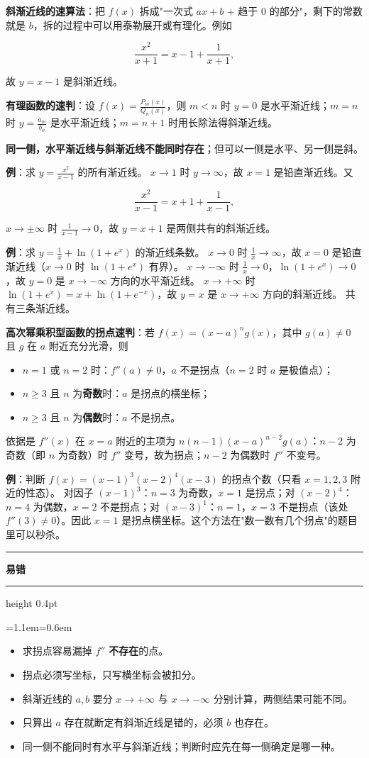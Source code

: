 \documentclass[11pt,openany,UTF8]{ctexbook}
\newcommand{\callouthead}[2]{%
  \par\addvspace{7pt}\noindent
  {\color{#1}\rule[-0.15em]{3pt}{1.05em}}\hspace{0.5em}%
  {\bfseries\color{#1}#2}\par\nobreak\vspace{-0.35em}%
  {\color{rulesep}\hrule height 0.4pt}\nobreak\vspace{0.45em}%
  \begingroup\small\setlength{\parindent}{0pt}%
  \leftskip=1.1em\rightskip=0.6em\noindent\ignorespaces}
\newcommand{\calloutend}{\par\endgroup\addvspace{7pt}}
\newenvironment{callwarn}[1]{\callouthead{warnbar}{#1}}{\calloutend}
\begin{document}
\textbf{斜渐近线的速算法}：把 $f(x)$ 拆成"一次式 $ax+b$ + 趋于 0 的部分"，剩下的常数就是 $b$，拆的过程中可以用泰勒展开或有理化。例如

\[\frac{x^2}{x+1}=x-1+\frac{1}{x+1},\]

故 $y=x-1$ 是斜渐近线。

\textbf{有理函数的速判}：设 $f(x)=\frac{P_m(x)}{Q_n(x)}$，则 $m<n$ 时 $y=0$ 是水平渐近线；$m=n$ 时 $y=\frac{a_m}{b_n}$ 是水平渐近线；$m=n+1$ 时用长除法得斜渐近线。

\textbf{同一侧，水平渐近线与斜渐近线不能同时存在}；但可以一侧是水平、另一侧是斜。

\textbf{例}：求 $y=\frac{x^2}{x-1}$ 的所有渐近线。 $x\to1$ 时 $y\to\infty$，故 $x=1$ 是铅直渐近线。又

\[\frac{x^2}{x-1}=x+1+\frac{1}{x-1},\]

$x\to\pm\infty$ 时 $\frac{1}{x-1}\to0$，故 $y=x+1$ 是两侧共有的斜渐近线。

\textbf{例}：求 $y=\frac1x+\ln(1+e^x)$ 的渐近线条数。 $x\to0$ 时 $\frac1x\to\infty$，故 $x=0$ 是铅直渐近线（$x\to0$ 时 $\ln(1+e^x)$ 有界）。 $x\to-\infty$ 时 $\frac1x\to0$，$\ln(1+e^x)\to0$，故 $y=0$ 是 $x\to-\infty$ 方向的水平渐近线。 $x\to+\infty$ 时 $\ln(1+e^x)=x+\ln(1+e^{-x})$，故 $y=x$ 是 $x\to+\infty$ 方向的斜渐近线。 共有三条渐近线。

\textbf{高次幂乘积型函数的拐点速判}：若 $f(x)=(x-a)^ng(x)$，其中 $g(a)\ne0$ 且 $g$ 在 $a$ 附近充分光滑，则

\begin{itemize}
\item $n=1$ 或 $n=2$ 时：$f''(a)\ne0$，$a$ 不是拐点（$n=2$ 时 $a$ 是极值点）；
\item $n\ge3$ 且 $n$ 为\textbf{奇数}时：$a$ 是拐点的横坐标；
\item $n\ge3$ 且 $n$ 为\textbf{偶数}时：$a$ 不是拐点。
\end{itemize}
依据是 $f''(x)$ 在 $x=a$ 附近的主项为 $n(n-1)(x-a)^{n-2}g(a)$：$n-2$ 为奇数（即 $n$ 为奇数）时 $f''$ 变号，故为拐点；$n-2$ 为偶数时 $f''$ 不变号。

\textbf{例}：判断 $f(x)=(x-1)^3(x-2)^4(x-3)$ 的拐点个数（只看 $x=1,2,3$ 附近的性态）。 对因子 $(x-1)^3$：$n=3$ 为奇数，$x=1$ 是拐点；对 $(x-2)^4$：$n=4$ 为偶数，$x=2$ 不是拐点；对 $(x-3)^1$：$n=1$，$x=3$ 不是拐点（该处 $f''(3)\ne0$）。因此 $x=1$ 是拐点横坐标。这个方法在"数一数有几个拐点"的题目里可以秒杀。

\begin{callwarn}{易错}
\begin{itemize}
\item 求拐点容易漏掉 $f''$ \textbf{不存在}的点。
\item 拐点必须写坐标，只写横坐标会被扣分。
\item 斜渐近线的 $a,b$ 要分 $x\to+\infty$ 与 $x\to-\infty$ 分别计算，两侧结果可能不同。
\item 只算出 $a$ 存在就断定有斜渐近线是错的，必须 $b$ 也存在。
\item 同一侧不能同时有水平与斜渐近线；判断时应先在每一侧确定是哪一种。
\end{itemize}
\end{callwarn}
\end{document}
